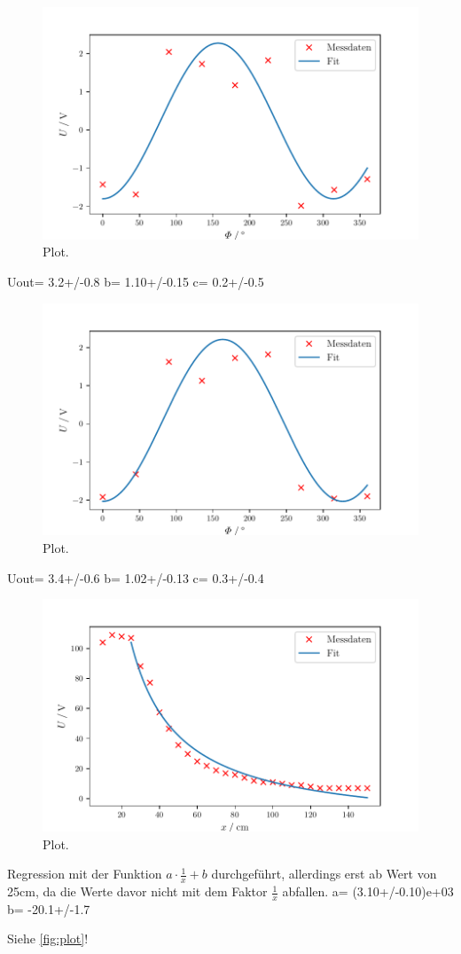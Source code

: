 \begin{figure}
  \centering
  \includegraphics{build/plot1.pdf}
  \caption{Plot.}
  \label{fig:plot1}
\end{figure}
Uout= 3.2+/-0.8
b= 1.10+/-0.15
c= 0.2+/-0.5
\begin{figure}
  \centering
  \includegraphics{build/plot2.pdf}
  \caption{Plot.}
  \label{fig:plot2}
\end{figure}

Uout= 3.4+/-0.6
b= 1.02+/-0.13
c= 0.3+/-0.4


\begin{figure}
  \centering
  \includegraphics{build/plot3.pdf}
  \caption{Plot.}
  \label{fig:plot3}
\end{figure}

Regression mit der Funktion $a \cdot \frac{1}{x} +b$ durchgeführt, allerdings erst ab Wert von 25cm, da die Werte davor nicht mit dem Faktor $\frac{1}{x}$ abfallen.
a= (3.10+/-0.10)e+03
b= -20.1+/-1.7

Siehe \autoref{fig:plot}!
